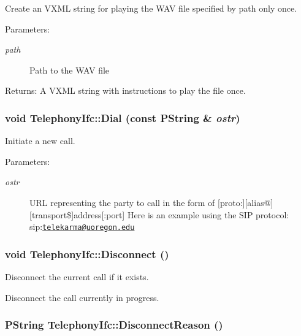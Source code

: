 Create an VXML string for playing the WAV file specified by path only once. 

\begin{Desc}
\item[Parameters:]
\begin{description}
\item[{\em path}]Path to the WAV file \end{description}
\end{Desc}
\begin{Desc}
\item[Returns:]A VXML string with instructions to play the file once. \end{Desc}
\hypertarget{classTelephonyIfc_2e0adbafa63cd9c07a1c1c6ce68bf933}{
\subsubsection[{Dial}]{\setlength{\rightskip}{0pt plus 5cm}void TelephonyIfc::Dial (const PString \& {\em ostr})}}
\label{classTelephonyIfc_2e0adbafa63cd9c07a1c1c6ce68bf933}


Initiate a new call. 

\begin{Desc}
\item[Parameters:]
\begin{description}
\item[{\em ostr}]URL representing the party to call in the form of \mbox{[}proto:\mbox{]}\mbox{[}alias@\mbox{]}\mbox{[}transport\$\mbox{]}address\mbox{[}:port\mbox{]} Here is an example using the SIP protocol: sip:\href{mailto:telekarma@uoregon.edu}{\tt telekarma@uoregon.edu} \end{description}
\end{Desc}
\hypertarget{classTelephonyIfc_68160576582be102ace0f4ae277d7129}{
\subsubsection[{Disconnect}]{\setlength{\rightskip}{0pt plus 5cm}void TelephonyIfc::Disconnect ()}}
\label{classTelephonyIfc_68160576582be102ace0f4ae277d7129}


Disconnect the current call if it exists. 

Disconnect the call currently in progress. \hypertarget{classTelephonyIfc_d5e6a50893f0915064f23c8d50de481f}{
\subsubsection[{DisconnectReason}]{\setlength{\rightskip}{0pt plus 5cm}PString TelephonyIfc::DisconnectReason ()}}
\label{classTelephonyIfc_d5e6a50893f0915064f23c8d50de481f}


